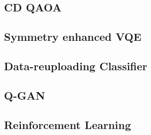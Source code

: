 \subsection{CD QAOA}


\subsection{Symmetry enhanced VQE}


\subsection{Data-reuploading Classifier}


\subsection{Q-GAN}


\subsection{Reinforcement Learning}


% 
